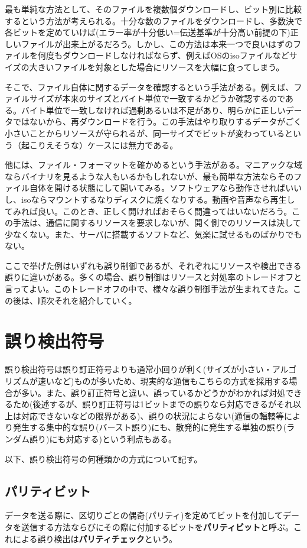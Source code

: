 最も単純な方法として、そのファイルを複数個ダウンロードし、ビット別に比較するという方法が考えられる。十分な数のファイルをダウンロードし、多数決で各ビットを定めていけば(エラー率が十分低い=伝送基準が十分高い前提の下)正しいファイルが出来上がるだろう。しかし、この方法は本来一つで良いはずのファイルを何度もダウンロードしなければならず、例えばOSのisoファイルなどサイズの大きいファイルを対象とした場合にリソースを大幅に食ってしまう。

そこで、ファイル自体に関するデータを確認するという手法がある。例えば、ファイルサイズが本来のサイズとバイト単位で一致するかどうか確認するのである。バイト単位で一致しなければ過剰あるいは不足があり、明らかに正しいデータではないから、再ダウンロードを行う。この手法はやり取りするデータがごく小さいことからリソースが守られるが、同一サイズでビットが変わっているという（起こりえそうな）ケースには無力である。

他には、ファイル・フォーマットを確かめるという手法がある。マニアックな域ならバイナリを見るような人もいるかもしれないが、最も簡単な方法ならそのファイル自体を開ける状態にして開いてみる。ソフトウェアなら動作させればいいし、isoならマウントするなりディスクに焼くなりする。動画や音声なら再生してみれば良い。このとき、正しく開ければおそらく間違ってはいないだろう。この手法は、通信に関するリソースを要求しないが、開く側でのリソースは決して少なくない。また、サーバに搭載するソフトなど、気楽に試せるものばかりでもない。

ここで挙げた例はいずれも誤り制御であるが、それぞれにリソースや検出できる誤りに違いがある。多くの場合、誤り制御はリソースと対処率のトレードオフと言ってよい。このトレードオフの中で、様々な誤り制御手法が生まれてきた。この後は、順次それを紹介していく。
\section{誤り検出符号}
誤り検出符号は誤り訂正符号よりも通常小回りが利く(サイズが小さい・アルゴリズムが速いなど)ものが多いため、現実的な通信もこちらの方式を採用する場合が多い。また、誤り訂正符号と違い、誤っているかどうかがわかれば対処できるため(後述するが、誤り訂正符号は1ビットまでの誤りなら対応できるがそれ以上は対応できないなどの限界がある)、誤りの状況によらない(通信の輻輳等により発生する集中的な誤り(バースト誤り)にも、散発的に発生する単独の誤り(ランダム誤り)にも対応する)という利点もある。

以下、誤り検出符号の何種類かの方式について記す。

\subsection{パリティビット}
データを送る際に、区切りごとの偶奇(パリティ)を定めてビットを付加してデータを送信する方法ならびにその際に付加するビットを\textbf{パリティビット}と呼ぶ。これによる誤り検出は\textbf{パリティチェック}という。

